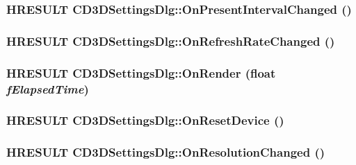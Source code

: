 \label{class_c_d3_d_settings_dlg_a5979860f92903f58815328188bb2255f}
\hypertarget{class_c_d3_d_settings_dlg_a4ebbdfd84ac6ddf9cfaa0aba72b49681}{
\subsubsection[{OnPresentIntervalChanged}]{\setlength{\rightskip}{0pt plus 5cm}HRESULT CD3DSettingsDlg::OnPresentIntervalChanged ()}}
\label{class_c_d3_d_settings_dlg_a4ebbdfd84ac6ddf9cfaa0aba72b49681}
\hypertarget{class_c_d3_d_settings_dlg_a5f321948ac07b6c0707dfa65f9cbd990}{
\subsubsection[{OnRefreshRateChanged}]{\setlength{\rightskip}{0pt plus 5cm}HRESULT CD3DSettingsDlg::OnRefreshRateChanged ()}}
\label{class_c_d3_d_settings_dlg_a5f321948ac07b6c0707dfa65f9cbd990}
\hypertarget{class_c_d3_d_settings_dlg_a395d09a31ad85f38fa495311629bf347}{
\subsubsection[{OnRender}]{\setlength{\rightskip}{0pt plus 5cm}HRESULT CD3DSettingsDlg::OnRender (float {\em fElapsedTime})}}
\label{class_c_d3_d_settings_dlg_a395d09a31ad85f38fa495311629bf347}
\hypertarget{class_c_d3_d_settings_dlg_af22c2f99599fd86040c834ca9757b3e6}{
\subsubsection[{OnResetDevice}]{\setlength{\rightskip}{0pt plus 5cm}HRESULT CD3DSettingsDlg::OnResetDevice ()}}
\label{class_c_d3_d_settings_dlg_af22c2f99599fd86040c834ca9757b3e6}
\hypertarget{class_c_d3_d_settings_dlg_a37daa5c226dfa883b9bd9675f587188d}{
\subsubsection[{OnResolutionChanged}]{\setlength{\rightskip}{0pt plus 5cm}HRESULT CD3DSettingsDlg::OnResolutionChanged ()}}
